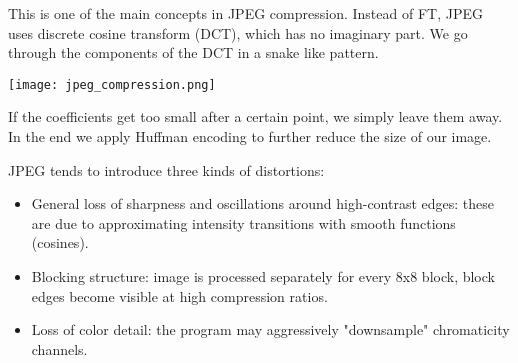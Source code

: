This is one of the main concepts in JPEG compression. Instead of FT, JPEG uses discrete cosine transform (DCT), which has no imaginary part. We go through the components of the DCT in a snake like pattern.
\begin{center}
	\texttt{[image: jpeg\_compression.png]}
\end{center}

If the coefficients get too small after a certain point, we simply leave them away. In the end we apply Huffman encoding to further reduce the size of our image. \medskip

JPEG tends to introduce three kinds of distortions:
\begin{itemize}
	\item General loss of sharpness and oscillations around high-contrast edges: these are due to approximating intensity transitions with smooth functions (cosines).
	\item Blocking structure: image is processed separately for every 8x8 block, block edges become visible at high compression ratios.
	\item Loss of color detail: the program may aggressively "downsample" chromaticity channels.
\end{itemize}
